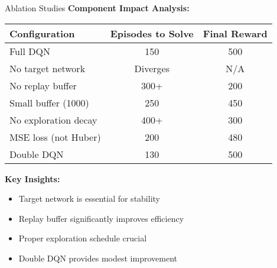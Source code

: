 \documentclass[aspectratio=169,10pt]{beamer}
\begin{document}
\begin{frame}{Ablation Studies}
\textbf{Component Impact Analysis:}
\begin{table}
\small
\begin{tabular}{l|c|c}
\hline
\textbf{Configuration} & \textbf{Episodes to Solve} & \textbf{Final Reward} \\
\hline
Full DQN & 150 & 500 \\
No target network & Diverges & N/A \\
No replay buffer & 300+ & 200 \\
Small buffer (1000) & 250 & 450 \\
No exploration decay & 400+ & 300 \\
MSE loss (not Huber) & 200 & 480 \\
Double DQN & 130 & 500 \\
\hline
\end{tabular}
\end{table}

\vspace{0.3cm}
\textbf{Key Insights:}
\begin{itemize}
    \item Target network is essential for stability
    \item Replay buffer significantly improves efficiency
    \item Proper exploration schedule crucial
    \item Double DQN provides modest improvement
\end{itemize}
\end{frame}
\end{document}
